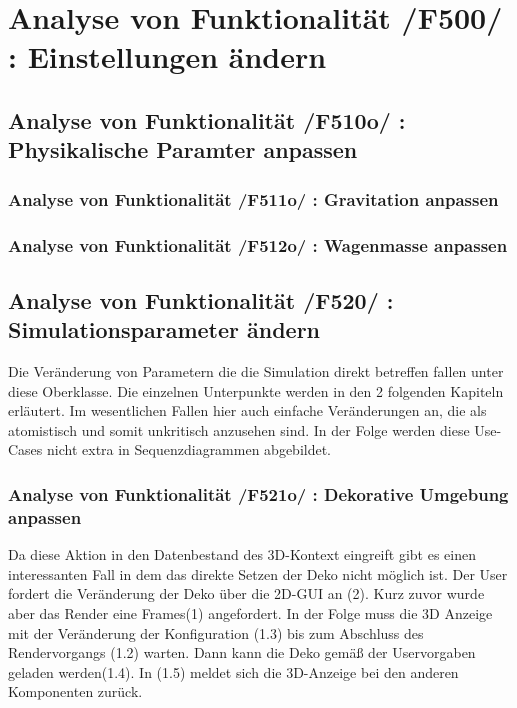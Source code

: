 \section{Analyse von Funktionalität /F500/ :  Einstellungen ändern}
\subsection{Analyse von Funktionalität /F510o/ :  Physikalische Paramter anpassen}
\subsubsection{Analyse von Funktionalität /F511o/ :  Gravitation anpassen}
\subsubsection{Analyse von Funktionalität /F512o/ :  Wagenmasse anpassen}
\subsection{Analyse von Funktionalität /F520/ :  Simulationsparameter ändern}
Die Veränderung von Parametern die die Simulation direkt betreffen fallen unter diese Oberklasse. Die einzelnen Unterpunkte werden in den 2 folgenden Kapiteln erläutert. Im wesentlichen Fallen hier 
auch einfache Veränderungen an, die als atomistisch und somit unkritisch anzusehen sind. In der Folge werden diese Use-Cases nicht extra in Sequenzdiagrammen abgebildet.
\subsubsection{Analyse von Funktionalität /F521o/ :  Dekorative Umgebung anpassen}
Da diese Aktion in den Datenbestand des 3D-Kontext eingreift gibt es einen interessanten Fall in dem das direkte Setzen der Deko nicht möglich ist. 
Der User fordert die Veränderung der Deko über die 2D-GUI an (2). Kurz zuvor wurde aber das Render eine Frames(1) angefordert. In der Folge muss die 3D Anzeige mit der Veränderung der Konfiguration (1.3)
bis zum Abschluss des Rendervorgangs (1.2) warten. Dann kann die Deko gemäß der Uservorgaben geladen werden(1.4). In (1.5) meldet sich die 3D-Anzeige bei den anderen Komponenten zurück. 

